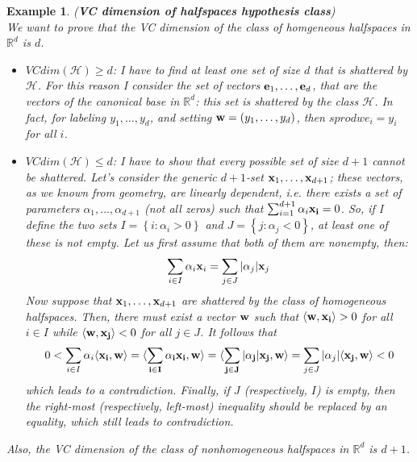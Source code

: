 \documentclass[12pt]{report}
\theoremstyle{plain}
\newtheorem{EX}{Example}
\newcommand\mcl[1]{\mathcal{#1}}
\newcommand\sprod[2]{\langle \vb{#1},\vb{#2}\rangle}
\begin{document}
\begin{flushleft}
\begin{EX} (\textbf{VC dimension of halfspaces hypothesis class})\\
	We want to prove that the VC dimension of the class of homgeneous 
	halfspaces in $\mathds{R}^d$ is $d$.
	\begin{itemize}
		\item $VCdim(\mcl{H})\geq d$: I have to find at least one set of size 
		$d$ that is shattered by $\mcl{H}$. For this reason I consider the set 
		of vectors $\vb{e}_1,\dots,\vb{e}_d$, that are the vectors of the 
		canonical base in $\mathds{R}^d$: this set is shattered by the class 
		$\mcl{H}$. In fact, for labeling $y_1,\dots,y_d$, and setting 
		$\vb{w}=(y_1,\dots,y_d)$, then $sprod{w}{e_i}=y_i$ for all $i$.
		\item $VCdim(\mcl{H})\leq d$: I have to show that every possible set of 
		size $d+1$ cannot be shattered. Let's consider the generic $d+1$-set 
		$\vb{x}_1,\dots,\vb{x}_{d+1}$; these vectors, as we known from 
		geometry, are linearly dependent, i.e. there exists a set of parameters 
		$\alpha_1,\dots,\alpha_{d+1}$ (not all zeros) such that 
		$\sum_{i=1}^{d+1}\alpha_i\vb{x_i}=0$. So, if I define the two sets 
		$I=\left\{i:\alpha_i>0\right\}$ and $J=\left\{j:\alpha_j<0\right\}$, at 
		least one of these is not empty. Let us first assume that both of them 
		are nonempty, then:
		\[ \sum_{i\in I}\alpha_i\vb{x}_i = \sum_{j\in J}\abs{\alpha_j}\vb{x}_j 
		\] 
		Now suppose that $\vb{x}_1,\dots,\vb{x}_{d+1}$ are shattered by the 
		class of homogeneous halfspaces. Then, there must exist a vector 
		$\vb{w}$ such that $\sprod{w}{x_i}>0$ for all $i\in I$ while 
		$\sprod{w}{x_j}<0$ for all $j\in J$. It follows that
		\[ 0<\sum_{i\in I}\alpha_i\sprod{x_i}{w}=\sprod{\sum_{i\in 
		I}\alpha_i\vb{x_i}}{w}=\sprod{\sum_{j\in 
		J}\abs{\alpha_j}\vb{x_j}}{w}=\sum_{j\in 
		J}\abs{\alpha_j}\sprod{x_j}{w}<0 \]
		which leads to a contradiction. Finally, if $J$ (respectively, $I$) is 
		empty, then the right-most (respectively, left-most) inequality should 
		be replaced by an equality, which still leads to contradiction.
	\end{itemize}
	Also, the VC dimension of the class of nonhomogeneous halfspaces in 
	$\mathds{R}^d$ is $d+1$.
\end{EX}


\end{flushleft}
\end{document}
